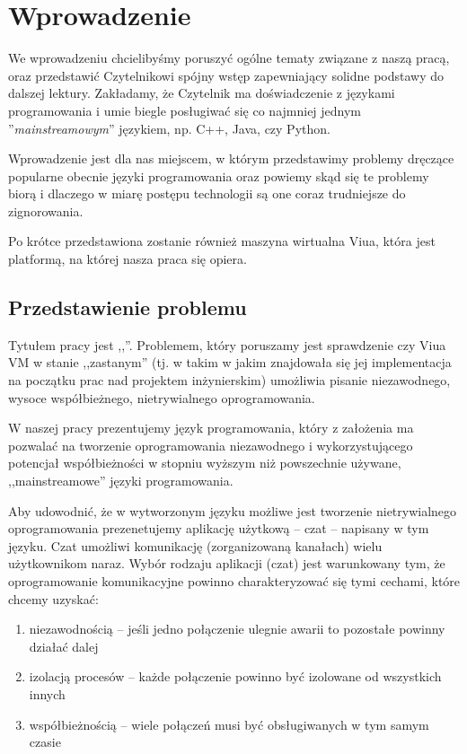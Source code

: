 \chapter{Wprowadzenie}
\label{wprowadzenie}

We wprowadzeniu chcielibyśmy poruszyć ogólne tematy związane z naszą pracą, oraz przedstawić Czytelnikowi
spójny wstęp zapewniający solidne podstawy do dalszej lektury. Zakładamy, że Czytelnik ma doświadczenie z
językami programowania i umie biegle posługiwać się co najmniej jednym ''\emph{mainstreamowym}'' językiem, np.
C++, Java, czy Python.

Wprowadzenie jest dla nas miejscem, w którym przedstawimy problemy dręczące popularne obecnie języki
programowania oraz powiemy skąd się te problemy biorą i dlaczego w miarę postępu technologii są one coraz
trudniejsze do zignorowania.

Po krótce przedstawiona zostanie również maszyna wirtualna Viua, która jest platformą, na której nasza praca
się opiera.

\section{Przedstawienie problemu}

Tytułem pracy jest ,,\inzmaintitlePL''. Problemem, który poruszamy jest sprawdzenie czy Viua VM w stanie
,,zastanym'' (tj. w takim w jakim znajdowała się jej implementacja na początku prac nad projektem
inżynierskim) umożliwia pisanie niezawodnego, wysoce współbieżnego, nietrywialnego oprogramowania.

W naszej pracy prezentujemy język programowania, który z założenia ma pozwalać na tworzenie oprogramowania
niezawodnego i wykorzystującego potencjał współbieżności w stopniu wyższym niż powszechnie używane,
,,mainstreamowe'' języki programowania.

Aby udowodnić, że w wytworzonym języku możliwe jest tworzenie nietrywialnego oprogramowania prezenetujemy
aplikację użytkową -- czat -- napisany w tym języku. Czat umożliwi komunikację (zorganizowaną kanałach) wielu
użytkownikom naraz. Wybór rodzaju aplikacji (czat) jest warunkowany tym, że oprogramowanie komunikacyjne
powinno charakteryzować się tymi cechami, które chcemy uzyskać:

\begin{enumerate}
    \item niezawodnością -- jeśli jedno połączenie ulegnie awarii to pozostałe powinny działać dalej
    \item izolacją procesów -- każde połączenie powinno być izolowane od wszystkich innych
    \item współbieżnością -- wiele połączeń musi być obsługiwanych w tym samym czasie
\end{enumerate}

